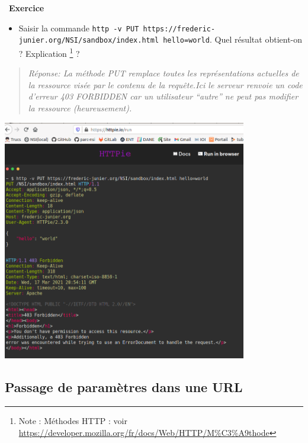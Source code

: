 \documentclass[
  11pt,
]{article}
\newcommand{\passthrough}[1]{#1}
\providecommand{\tightlist}{%
  \setlength{\itemsep}{0pt}\setlength{\parskip}{0pt}}
\newcounter{exo}
\newenvironment{exercice}[1]
{\par \medskip   \addtocounter{exo}{1} \noindent  
\begin{bclogo}[arrondi =0.1,   noborder = true, logo=\bccrayon, marge=4]{~\textbf{Exercice} \textbf{\theexo} {\itshape #1} }  \par}
{
\end{bclogo}
 \par \bigskip }
\begin{document}
\begin{exercice}{}
\begin{enumerate}
  \begin{itemize}
  \tightlist
  \item
    Saisir la commande
    \passthrough{\lstinline!http -v PUT https://frederic-junier.org/NSI/sandbox/index.html hello=world!}.
    Quel résultat obtient-on ? Explication \footnote{Note : Méthodes
      HTTP : voir
      \url{https://developer.mozilla.org/fr/docs/Web/HTTP/M\%C3\%A9thode}}
    ?
  \end{itemize}

  \begin{quote}
  \emph{Réponse: La méthode PUT remplace toutes les représentations
  actuelles de la ressource visée par le contenu de la requête.Ici le
  serveur renvoie un code d'erreur 403 FORBIDDEN car un utilisateur
  ``autre'' ne peut pas modifier la ressource (heureusement).}
  \end{quote}
\end{enumerate}

\includegraphics[width=0.8\textwidth,height=\textheight]{images/http_pie3.png}\\

\end{exercice}

\hypertarget{passage-de-paramuxe8tres-dans-une-url}{%
\subsection{Passage de paramètres dans une
URL}\label{passage-de-paramuxe8tres-dans-une-url}}
\end{document}

